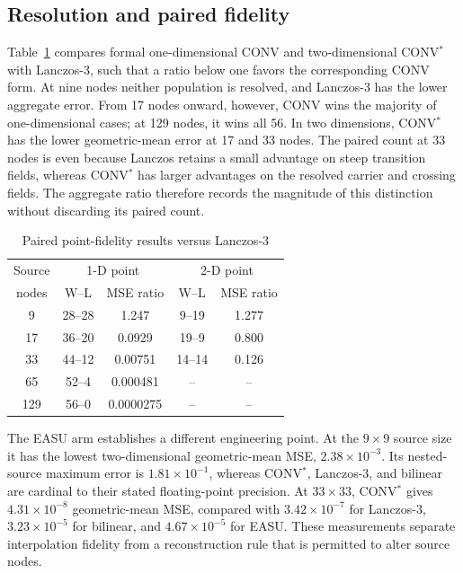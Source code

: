 \subsection{Resolution and paired fidelity}

Table~\ref{tab:pairedfidelity} compares formal one-dimensional CONV and
two-dimensional CONV$^{*}$ with Lanczos-3, such that a ratio below one favors
the corresponding CONV form. At nine nodes neither population is resolved,
and Lanczos-3 has the lower aggregate error. From 17 nodes onward, however,
CONV wins the majority of one-dimensional cases; at 129 nodes, it wins all
56. In two dimensions, CONV$^{*}$ has the lower geometric-mean error at 17
and 33 nodes. The paired count at 33 nodes is even because Lanczos retains a
small advantage on steep transition fields, whereas CONV$^{*}$ has larger
advantages on the resolved carrier and crossing fields. The aggregate ratio
therefore records the magnitude of this distinction without discarding its
paired count.

\begin{table}[H]
\caption{Paired point-fidelity results versus Lanczos-3}
\label{tab:pairedfidelity}
\centering
\scriptsize
\setlength{\tabcolsep}{3.0pt}
\begin{tabular}{c|cc|cc}
\hline
Source & \multicolumn{2}{c|}{1-D point} &
\multicolumn{2}{c}{2-D point} \\
nodes & W--L & MSE ratio & W--L & MSE ratio \\
\hline
9   & 28--28 & 1.247 & 9--19  & 1.277 \\
17  & 36--20 & 0.0929 & 19--9 & 0.800 \\
33  & 44--12 & 0.00751 & 14--14 & 0.126 \\
65  & 52--4  & 0.000481 & -- & -- \\
129 & 56--0  & 0.0000275 & -- & -- \\
\hline
\end{tabular}
\end{table}

The EASU arm establishes a different engineering point. At the $9\times9$
source size it has the lowest two-dimensional geometric-mean MSE,
$2.38\times10^{-3}$. Its nested-source maximum error is $1.81\times10^{-1}$,
whereas CONV$^{*}$, Lanczos-3, and bilinear are cardinal to their stated
floating-point precision. At $33\times33$, CONV$^{*}$ gives
$4.31\times10^{-8}$ geometric-mean MSE, compared
with $3.42\times10^{-7}$ for Lanczos-3, $3.23\times10^{-5}$ for bilinear,
and $4.67\times10^{-5}$ for EASU. These measurements separate interpolation
fidelity from a reconstruction rule that is permitted to alter source nodes.

